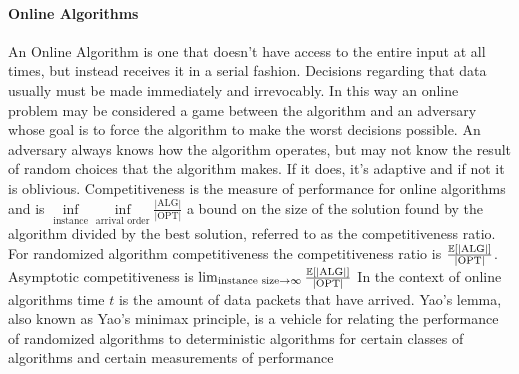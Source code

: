 \paragraph{Online Algorithms}
An Online Algorithm is one that doesn't have access to the entire input at all times, but instead receives it in a serial fashion. Decisions regarding that data usually must be made immediately and irrevocably. In this way an online problem may be considered a game between the algorithm and an adversary whose goal is to force the algorithm to make the worst decisions possible. An adversary always knows how the algorithm operates, but may not know the result of random choices that the algorithm makes. If it does, it's adaptive and if not it is oblivious. Competitiveness is the measure of performance for online algorithms and is $\inf\limits_{\text{instance}}\inf\limits_{\text{arrival order}}\frac{|\mathrm{ALG}|}{|\mathrm{OPT}|}$ a bound on the size of the solution found by the algorithm divided by the best solution, referred to as the competitiveness ratio. For randomized algorithm competitiveness the competitiveness ratio is $\frac{\mathbb{E}[|\mathrm{ALG}|]}{|\mathrm{OPT}|}$. Asymptotic competitiveness is $\lim_{\text{instance size}\to\infty}\frac{\mathbb{E}[|\mathrm{ALG}|]}{|\mathrm{OPT}|}$ In the context of online algorithms time $t$ is the amount of data packets that have arrived. Yao's lemma, also known as Yao's minimax principle, is a vehicle for relating the performance of randomized algorithms to deterministic algorithms for certain classes of algorithms and certain measurements of performance
